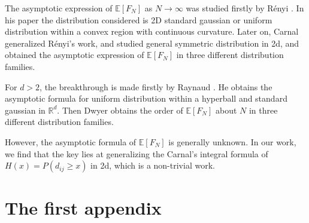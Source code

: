 \documentclass{aptpub}
\def\E{\mathbb{E}}
\begin{document}
The asymptotic expression of $\E[F_N]$ as $N\to \infty$
was studied firstly by R{\'e}nyi \cite{renyi1963konvexe}.
In his paper the distribution considered
is 2D standard gaussian or uniform distribution within a convex region with continuous curvature.
Later on, Carnal \cite{carnal1970konvexe} generalized R{\'e}nyi's work,
and studied general symmetric distribution in 2d,
and obtained the asymptotic expression of $\E[F_N]$
in three different distribution families.

For $d>2$, the breakthrough is made firstly by
Raynaud
\cite{raynaud1970enveloppe}.
He obtains the asymptotic formula for uniform distribution within a hyperball
and standard gaussian in $\mathbb{R}^d$.
Then Dwyer \cite{dwyer1991convex} obtains the order of $\E[F_N]$ about $N$
in three different distribution families.

However, the asymptotic formula of $\E[F_N]$ is generally unknown.
In our work, we find that the key lies at generalizing the Carnal's integral formula
of $H(x)=P(d_{ij}\geq x)$ in 2d, which is a non-trivial work.




\appendix

\section{The first appendix}

\end{document}
